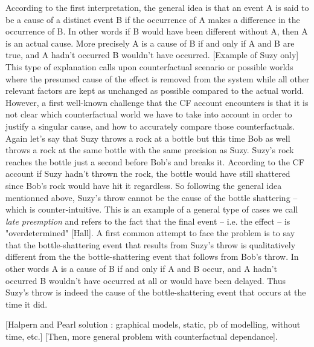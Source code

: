 \documentclass[10pt,letterpaper]{article}
\begin{document}
According to the first interpretation, the general idea is that an event A is said to be a cause of a distinct event B if the occurrence of A makes a difference in the occurrence of B. In other words if B would have been different without A, then A is an actual cause. More precisely A is a cause of B if and only if A and B are true, and A hadn't occurred B wouldn't have occurred. [Example of Suzy only] This type of explanation calls upon counterfactual scenario or possible worlds where the presumed cause of the effect is removed from the system while all other relevant factors are kept as unchanged as possible compared to the actual world. However, a first well-known challenge that the CF account encounters is that it is not clear which counterfactual world we have to take into account in order to justify a singular cause, and how to accurately compare those counterfactuals. Again let's say that Suzy throws a rock at a bottle but this time Bob as well throws a rock at the same bottle with the same precision as Suzy. Suzy's rock reaches the bottle just a second before Bob's and breaks it. According to the CF account if Suzy hadn't thrown the rock, the bottle would have still shattered since Bob's rock would have hit it regardless. So following the general idea mentionned above, Suzy's throw cannot be the cause of the bottle shattering -- which is counter-intuitive. This is an example of a general type of cases we call \textit{late preemption} and refers to the fact that the final event -- i.e. the effect -- is "overdetermined" [Hall]. A first common attempt to face the problem is to say that the bottle-shattering event that results from Suzy's throw is qualitatively different from the the bottle-shattering event that follows from Bob's throw. In other words A is a cause of B if and only if A and B occur, and A hadn't occurred B wouldn't have occurred at all or would have been delayed. Thus Suzy's throw is indeed the cause of the bottle-shattering event that occurs at the time it did. 

[Halpern and Pearl solution : graphical models, static, pb of modelling, without time, etc.] 
[Then, more general problem with counterfactual dependance].
\end{document}
